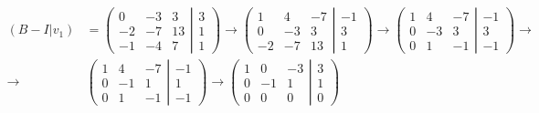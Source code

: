 \documentclass{article}
\begin{document}
\begin{align*}
    (B-I | v_1) & =
    \left(
    \begin{matrix}
        0  & -3 & 3  \\
        -2 & -7 & 13 \\
        -1 & -4 & 7
    \end{matrix}
    \left|
    \begin{matrix}
        3 \\
        1 \\
        1
    \end{matrix}
    \right.
    \right)\rightarrow
    \left(
    \begin{matrix}
        1  & 4  & -7 \\
        0  & -3 & 3  \\
        -2 & -7 & 13
    \end{matrix}
    \left|
    \begin{matrix}
        -1 \\
        3  \\
        1
    \end{matrix}
    \right.
    \right)\rightarrow
    \left(
    \begin{matrix}
        1 & 4  & -7 \\
        0 & -3 & 3  \\
        0 & 1  & -1
    \end{matrix}
    \left|
    \begin{matrix}
        -1 \\
        3  \\
        -1
    \end{matrix}
    \right.
    \right)\rightarrow \\
    \rightarrow &
    \left(
    \begin{matrix}
        1 & 4  & -7 \\
        0 & -1 & 1  \\
        0 & 1  & -1
    \end{matrix}
    \left|
    \begin{matrix}
        -1 \\
        1  \\
        -1
    \end{matrix}
    \right.
    \right)\rightarrow
    \left(
    \begin{matrix}
        1 & 0  & -3 \\
        0 & -1 & 1  \\
        0 & 0  & 0
    \end{matrix}
    \left|
    \begin{matrix}
        3 \\
        1 \\
        0
    \end{matrix}
    \right.
    \right)
\end{align*}
\end{document}
